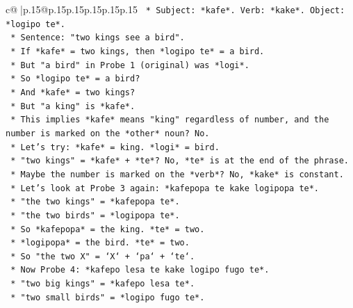\documentclass{article}
\begin{document}
{\begin{supertabular}{c@{$\;$}|p{.15\linewidth}@{}p{.15\linewidth}p{.15\linewidth}p{.15\linewidth}p{.15\linewidth}p{.15\linewidth}}
{{{\texttt{                                *   Subject: *kafe*. Verb: *kake*. Object: *logipo te*.} \\
\texttt{                                *   Sentence: "two kings see a bird".} \\
\texttt{                                *   If *kafe* = two kings, then *logipo te* = a bird.} \\
\texttt{                                *   But "a bird" in Probe 1 (original) was *logi*.} \\
\texttt{                                *   So *logipo te* = a bird?} \\
\texttt{                                *   And *kafe* = two kings?} \\
\texttt{                                *   But "a king" is *kafe*.} \\
\texttt{                                *   This implies *kafe* means "king" regardless of number, and the number is marked on the *other* noun? No.} \\
\texttt{                                *   Let's try: *kafe* = king. *logi* = bird.} \\
\texttt{                                *   "two kings" = *kafe* + *te*? No, *te* is at the end of the phrase.} \\
\texttt{                                *   Maybe the number is marked on the *verb*? No, *kake* is constant.} \\
\texttt{                                *   Let's look at Probe 3 again: *kafepopa te kake logipopa te*.} \\
\texttt{                                    *   "the two kings" = *kafepopa te*.} \\
\texttt{                                    *   "the two birds" = *logipopa te*.} \\
\texttt{                                    *   So *kafepopa* = the king. *te* = two.} \\
\texttt{                                    *   *logipopa* = the bird. *te* = two.} \\
\texttt{                                    *   So "the two X" = `X` + `pa` + `te`.} \\
\texttt{                                *   Now Probe 4: *kafepo lesa te kake logipo fugo te*.} \\
\texttt{                                    *   "two big kings" = *kafepo lesa te*.} \\
\texttt{                                    *   "two small birds" = *logipo fugo te*.} \\
}}}
\end{supertabular}}
\end{document}
